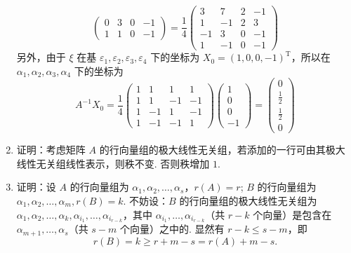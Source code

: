 \begin{enumerate}
\[\begin{pmatrix}
                  0 & 3 & 0 & -1 \\
                  1 & 1 & 0 & -1
              \end{pmatrix} = \frac{1}{4} \begin{pmatrix}
                  3  & 7  & 2 & -1 \\
                  1  & -1 & 2 & 3  \\
                  -1 & 3  & 0 & -1 \\
                  1  & -1 & 0 & -1
              \end{pmatrix} \]
          另外，由于 $ \xi $ 在基 $ \varepsilon_1, \varepsilon_2, \varepsilon_3, \varepsilon_4 $ 下的坐标为 $ X_0 = (1, 0, 0, -1)^{\mathrm{T}} $，所以在 $ \alpha_1, \alpha_2, \alpha_3, \alpha_4 $ 下的坐标为
          \[ A^{-1} X_0 = \frac{1}{4} \begin{pmatrix}
                  1 & 1  & 1  & 1  \\
                  1 & 1  & -1 & -1 \\
                  1 & -1 & 1  & -1 \\
                  1 & -1 & -1 & 1
              \end{pmatrix} \begin{pmatrix}
                  1 \\ 0 \\ 0 \\ -1
              \end{pmatrix} = \begin{pmatrix}
                  0 \\ \frac{1}{2} \\ \frac{1}{2} \\ 0
              \end{pmatrix} \]

    \item 证明：考虑矩阵 $A$ 的行向量组的极大线性无关组，若添加的一行可由其极大线性无关组线性表示，则秩不变. 否则秩增加 $1$.

    \item 证明：设 $A$ 的行向量组为 $\alpha_1,\alpha_2,\ldots,\alpha_s$，$r(A)=r$; $B$ 的行向量组为 $\alpha_1,\alpha_2,\ldots,\alpha_m ,r(B)=k$.
          不妨设：$B$ 的行向量组的极大线性无关组为 $\alpha_1,\alpha_2,\ldots,\alpha_k,\alpha_{i_1},\ldots,\alpha_{i_{r-k}}$，其中 $\alpha_{i_1},\ldots,\alpha_{i_{r-k}}$（共 $r-k$ 个向量）是包含在 $\alpha_{m+1},\ldots,\alpha_s$（共 $s-m$ 个向量）之中的. 显然有 $r-k \leqslant s-m $，即
          \[r(B)=k\geqslant r+m-s=r(A)+m-s.\]
\end{enumerate}

